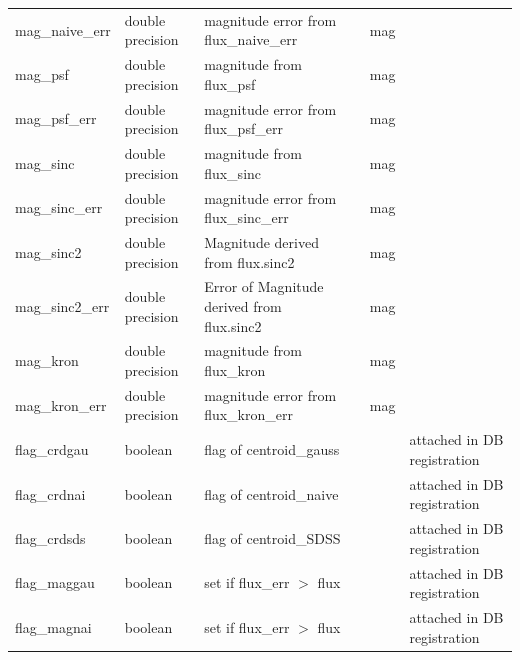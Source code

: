 \documentclass[12pt]{article}
\begin{document}
\begin{table}[thbp]
\begin{center}
{\begin{tabular}{llllll}
mag\_naive\_err & double precision & magnitude error from flux\_naive\_err                   &                            & mag         &   \\
mag\_psf & double precision & magnitude from flux\_psf                             &                            & mag         &   \\
mag\_psf\_err & double precision & magnitude error from flux\_psf\_err                     &                            & mag         &   \\
mag\_sinc & double precision & magnitude from flux\_sinc                            &                            & mag         &   \\
mag\_sinc\_err & double precision & magnitude error from flux\_sinc\_err                    &                            & mag         &   \\
mag\_sinc2 & double precision & Magnitude derived from flux.sinc2                         &                           & mag              &             \\
mag\_sinc2\_err & double precision & Error of Magnitude derived from flux.sinc2                &                           & mag              &             \\
mag\_kron & double precision & magnitude from flux\_kron                            &                            & mag         &   \\
mag\_kron\_err & double precision & magnitude error from flux\_kron\_err                    &                            & mag         &   \\
flag\_crdgau & boolean & flag of centroid\_gauss                              &                            &             & attached in DB registration  \\
flag\_crdnai & boolean & flag of centroid\_naive                              &                            &             & attached in DB registration  \\
flag\_crdsds & boolean & flag of centroid\_SDSS                               &                            &             & attached in DB registration  \\
flag\_maggau & boolean & set if flux\_err $>$ flux                              &                            &             & attached in DB registration  \\
flag\_magnai & boolean & set if flux\_err $>$ flux                              &                            &             & attached in DB registration  \\

\end{tabular}}
\end{center}
\end{table}
\end{document}
